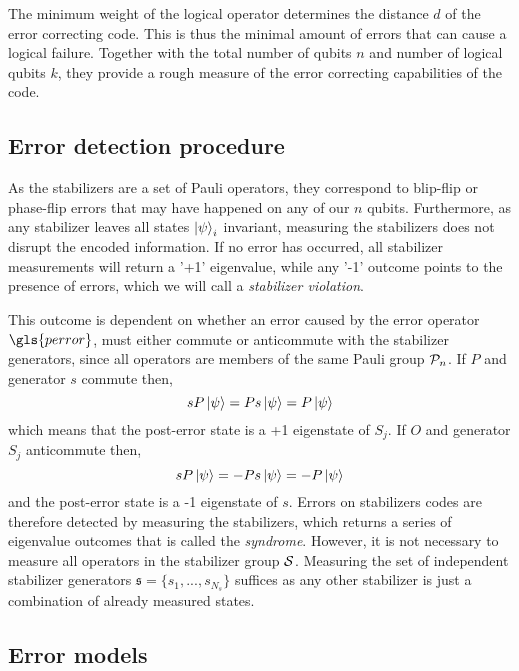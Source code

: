 The minimum weight of the logical operator determines the distance $d$ of the error correcting code. This is thus the minimal amount of errors that can cause a logical failure. Together with the total number of qubits $n$ and number of logical qubits $k$, they provide a rough measure of the error correcting capabilities of the code.

\subsection{Error detection procedure}

As the stabilizers are a set of Pauli operators, they correspond to blip-flip or phase-flip errors that may have happened on any of our $n$ qubits. Furthermore, as any stabilizer leaves all states  $\ket{\psi}_i$ invariant, measuring the stabilizers does not disrupt the encoded information. If no error has occurred, all stabilizer measurements will return a '+1' eigenvalue, while any '-1' outcome points to the presence of errors, which we will call a \emph{stabilizer violation}.

This outcome is dependent on whether an error caused by the error operator $\gls{perror}$, must either commute or anticommute with the stabilizer generators, since all operators are members of the same Pauli group $\mathcal{P}_n$. If $P$ and generator $s$ commute then,
\begin{equation}
  sP\ket{\psi} = Ps\ket{\psi} = P\ket{\psi}
\end{equation}
which means that the post-error state is a +1 eigenstate of $S_j$. If $O$ and generator $S_j$ anticommute then,
\begin{equation}\label{qec:eq:stabmeas}
  sP\ket{\psi} = -Ps\ket{\psi} = -P\ket{\psi}
\end{equation}
and the post-error state is a -1 eigenstate of $s$. Errors on stabilizers codes are therefore detected by measuring the stabilizers, which returns a series of eigenvalue outcomes that is called the \emph{syndrome}. However, it is not necessary to measure all operators in the stabilizer group $\mathcal{S}$. Measuring the set of independent stabilizer generators $\mathfrak{s}=\{s_1,...,s_{N_s}\}$ suffices as any other stabilizer is just a combination of already measured states.

\subsection{Error models}\label{qec:sec_errormodels}

